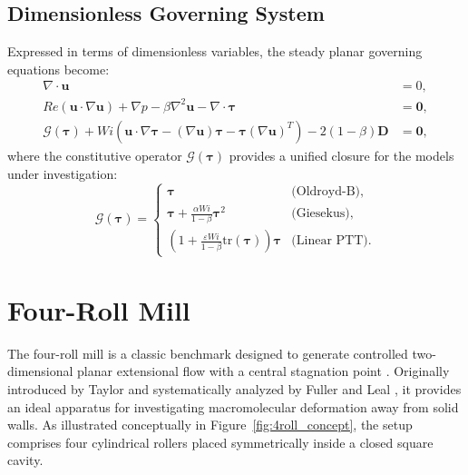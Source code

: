 \subsection{Dimensionless Governing System}
\label{subsec:dimensionless_vector_system}
Expressed in terms of dimensionless variables, the steady planar governing equations become:
\begin{align}
    \nabla \cdot \boldsymbol{u} &= 0 , \label{eq:dimless_mass} \\
    Re (\boldsymbol{u} \cdot \nabla \boldsymbol{u}) + \nabla p - \beta \nabla^2 \boldsymbol{u} - \nabla \cdot \boldsymbol{\tau} &= \boldsymbol{0} , \label{eq:dimless_momentum} \\
    \boldsymbol{\mathcal{G}}(\boldsymbol{\tau}) + Wi \left( \boldsymbol{u} \cdot \nabla \boldsymbol{\tau} - (\nabla \boldsymbol{u}) \boldsymbol{\tau} - \boldsymbol{\tau} (\nabla \boldsymbol{u})^T \right) - 2(1 - \beta) \boldsymbol{D} &= \boldsymbol{0} , \label{eq:dimless_constitutive_unified}
\end{align}
where the constitutive operator $\boldsymbol{\mathcal{G}}(\boldsymbol{\tau})$ provides a unified closure for the models under investigation:
\begin{equation}
    \boldsymbol{\mathcal{G}}(\boldsymbol{\tau}) = 
    \begin{cases}
        \boldsymbol{\tau} & \text{(Oldroyd-B)}, \\[1ex]
        \boldsymbol{\tau} + \frac{\alpha Wi}{1 - \beta} \boldsymbol{\tau}^2 & \text{(Giesekus)}, \\[1ex]
        \left(1 + \frac{\varepsilon Wi}{1 - \beta} \text{tr}(\boldsymbol{\tau})\right) \boldsymbol{\tau} & \text{(Linear PTT)} .
    \end{cases}
    \label{eq:constitutive_operator_cases}
\end{equation}

\section{Four-Roll Mill}
\label{sec:four_roll_mill_bcs}

The four-roll mill is a classic benchmark designed to generate controlled two-dimensional planar extensional flow
with a central stagnation point \cite{taylor1934formation, fuller1980flow, fuller1981flow, bentley1986experimental}.
Originally introduced by Taylor \cite{taylor1934formation} and systematically analyzed by Fuller and Leal \cite{fuller1980flow, fuller1981flow},
it provides an ideal apparatus for investigating macromolecular deformation away from solid walls.
As illustrated conceptually in Figure~\ref{fig:4roll_concept}, the setup comprises four cylindrical rollers placed symmetrically inside a closed square cavity.

